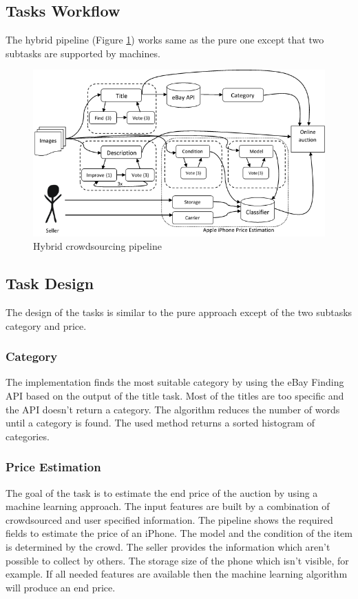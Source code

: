 \subsection{Tasks Workflow}
The hybrid pipeline (Figure \ref{hybridPipeline}) works same as the pure one except that two subtasks are supported by machines.
\begin{figure}[h!]
\centering
\includegraphics[scale=0.8]{images/pipelines/Hybrid_Pipeline.png}
\caption{Hybrid crowdsourcing pipeline}
\label{hybridPipeline}
\end{figure}
\subsection{Task Design}
The design of the tasks is similar to the pure approach except of the two subtasks category and price.
\subsubsection{Category}
The implementation finds the most suitable category by using the eBay Finding API based on the output of the title task. Most of the titles are too specific and the API doesn't return a category. The algorithm reduces the number of words until a category is found. The used method returns a sorted histogram of categories.
\subsubsection{Price Estimation}
The goal of the task is to estimate the end price of the auction by using a machine learning approach. The input features are built by a combination of crowdsourced and user specified information. The pipeline shows the required fields to estimate the price of an iPhone. The model and the condition of the item is determined by the crowd. The seller provides the information which aren't possible to collect by others. The storage size of the phone which isn't visible, for example. If all needed features are available then the machine learning algorithm will produce an end price.

